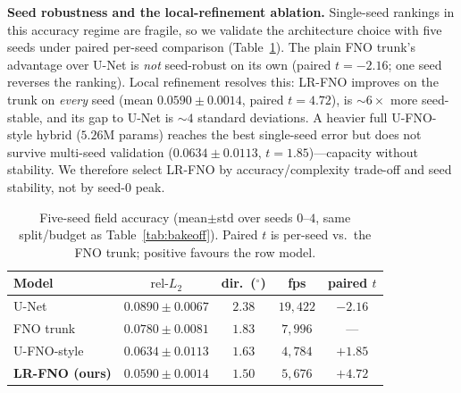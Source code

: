 \documentclass[conference]{IEEEtran}
\newcommand{\relL}{\mathrm{rel}\text{-}L_2}
\newcommand{\lrfnoMean}{0.0590} \newcommand{\lrfnoStd}{0.0014} \newcommand{\lrfnoT}{4.72}
\newcommand{\fnoMean}{0.0780}   \newcommand{\fnoStd}{0.0081}
\newcommand{\unetMean}{0.0890}  \newcommand{\unetStd}{0.0067}  \newcommand{\unetT}{-2.16}
\newcommand{\ufnoMean}{0.0634}  \newcommand{\ufnoStd}{0.0113}  \newcommand{\ufnoT}{1.85}
\newcommand{\seedStableX}{6}    %
\newcommand{\unetSigmaGap}{4}   %
\begin{document}
\textbf{Seed robustness and the local-refinement ablation.}
Single-seed rankings in this accuracy regime are fragile, so we validate the
architecture choice with five seeds under paired per-seed comparison
(Table~\ref{tab:multiseed}). The plain FNO trunk's advantage over U-Net is
\emph{not} seed-robust on its own (paired $t{=}\unetT$; one seed reverses the
ranking). Local refinement resolves this: LR-FNO improves on the trunk on
\emph{every} seed (mean $\lrfnoMean\pm\lrfnoStd$, paired $t{=}\lrfnoT$), is
${\sim}\seedStableX\times$ more seed-stable, and its gap to U-Net is
${\sim}\unetSigmaGap$ standard deviations. A
heavier full U-FNO-style hybrid ($5.26$M params) reaches the best single-seed
error but does not survive multi-seed validation ($\ufnoMean\pm\ufnoStd$,
$t{=}\ufnoT$)---capacity without stability. We therefore select LR-FNO by
accuracy/complexity trade-off and seed stability, not by seed-0 peak.

\begin{table}[t]
\centering
\caption{Five-seed field accuracy (mean$\pm$std over seeds $0$--$4$, same
split/budget as Table~\ref{tab:bakeoff}). Paired $t$ is per-seed vs.\ the FNO
trunk; positive favours the row model.}
\label{tab:multiseed}
\setlength{\tabcolsep}{3.5pt}
\footnotesize
\begin{tabular}{@{}lcccc@{}}
\toprule
Model & $\relL$ & dir.\ ($^\circ$) & fps & paired $t$ \\
\midrule
U-Net & $\unetMean\pm\unetStd$ & $2.38$ & $19{,}422$ & $\unetT$ \\
FNO trunk & $\fnoMean\pm\fnoStd$ & $1.83$ & $7{,}996$ & --- \\
U-FNO-style~\cite{wen2022ufno} & $\ufnoMean\pm\ufnoStd$ & $1.63$ & $4{,}784$ & $+\ufnoT$ \\
\textbf{LR-FNO (ours)} & $\mathbf{\lrfnoMean\pm\lrfnoStd}$ & $\mathbf{1.50}$ & $5{,}676$ & $+\lrfnoT$ \\
\bottomrule
\end{tabular}
\end{table}
\end{document}
